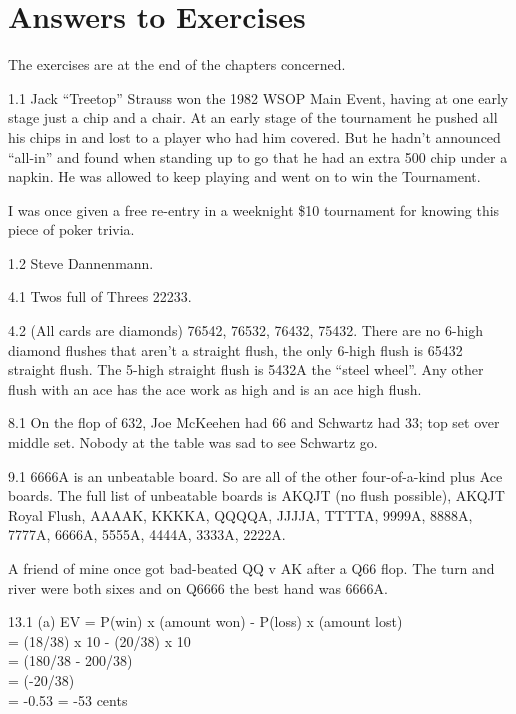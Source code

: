 \chapter{Answers to Exercises}

The exercises are at the end of the chapters concerned.


1.1 Jack ``Treetop'' Strauss won the 1982 WSOP Main Event,
having at one early stage just a chip and a chair. At an early
stage of the tournament he pushed all his chips in and lost to a
player who had him covered. But he hadn't announced ``all-in'' and
found when standing up to go that he had an extra 500 chip under a
napkin. He was allowed to keep playing and went on to win the
Tournament.

I was once given a free re-entry in a weeknight \$10 tournament for
knowing this piece of poker trivia.

1.2 Steve Dannenmann.


4.1 Twos full of Threes 22233.

4.2 (All cards are diamonds) 76542, 76532, 76432, 75432. There are no
6-high diamond flushes that aren't a straight flush, the only 6-high
flush is 65432 straight flush. The 5-high straight flush is 5432A the
``steel wheel''. Any other flush with an ace has the ace work as high
and is an ace high flush.

8.1 On the flop of 632, Joe McKeehen had 66 and Schwartz had 33; top
set over middle set. Nobody at the table was sad to see Schwartz go.

9.1 6666A is an unbeatable board. So are all of the other
four-of-a-kind plus Ace boards. The full list of unbeatable boards is
AKQJT (no flush possible), AKQJT Royal Flush, AAAAK, KKKKA, QQQQA,
JJJJA, TTTTA, 9999A, 8888A, 7777A, 6666A, 5555A, 4444A, 3333A, 2222A.

A friend of mine once got bad-beated QQ v AK after a Q66 flop. The
turn and river were both sixes and on Q6666 the best hand was 6666A.

13.1 (a) EV = P(win) x (amount won) - P(loss) x (amount lost) \\
= (18/38) x 10 - (20/38) x 10 \\
= (180/38 - 200/38) \\
= (-20/38) \\
= -0.53 = -53 cents

